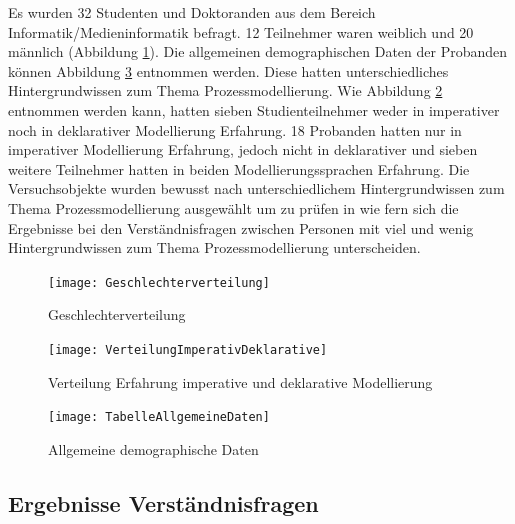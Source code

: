 Es wurden 32 Studenten und Doktoranden aus dem Bereich Informatik/Medieninformatik befragt. 12 Teilnehmer waren weiblich und 20 männlich (Abbildung \ref{fig:Geschlechterverteilung}). Die allgemeinen demographischen Daten der Probanden können Abbildung \ref{fig:TabelleAllgemeineDaten} entnommen werden. Diese hatten unterschiedliches Hintergrundwissen zum Thema Prozessmodellierung. Wie Abbildung \ref{fig:VerteilungImperativDeklarative} entnommen werden kann, hatten sieben Studienteilnehmer weder in imperativer noch in deklarativer Modellierung Erfahrung. 18 Probanden hatten nur in imperativer Modellierung Erfahrung, jedoch nicht in deklarativer und sieben weitere Teilnehmer hatten in beiden Modellierungssprachen Erfahrung. Die Versuchsobjekte wurden bewusst nach unterschiedlichem Hintergrundwissen zum Thema Prozessmodellierung ausgewählt um zu prüfen in wie fern sich die Ergebnisse bei den Verständnisfragen zwischen Personen mit viel und wenig Hintergrundwissen zum Thema Prozessmodellierung unterscheiden.\newline

\begin{figure}[htp]
\begin{center}
  \texttt{[image: Geschlechterverteilung]} %
  \caption{Geschlechterverteilung}
  \label{fig:Geschlechterverteilung}
\end{center}
\end{figure}

\begin{figure}[htp]
\begin{center}
  \texttt{[image: VerteilungImperativDeklarative]} %
  \caption{Verteilung Erfahrung imperative und deklarative Modellierung}
  \label{fig:VerteilungImperativDeklarative}
\end{center}
\end{figure}

\begin{figure}[htp]
\begin{center}
  \texttt{[image: TabelleAllgemeineDaten]} %
  \caption{Allgemeine demographische Daten}
  \label{fig:TabelleAllgemeineDaten}
\end{center}
\end{figure}



\subsection{Ergebnisse Verständnisfragen}

